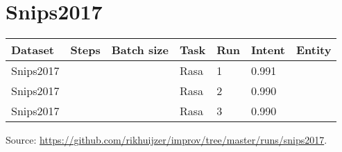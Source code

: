 \section{Snips2017}
\label{sec:runs_snips}
\begin{center}
    \begin{tabular}{l l l l l l l}
        \textbf{Dataset} & \textbf{Steps} & \textbf{Batch size} & \textbf{Task} & \textbf{Run} & \textbf{Intent} & \textbf{Entity} \\
        \hline
        Snips2017 & & & Rasa & 1 & 0.991 \\
        Snips2017 & & & Rasa & 2 & 0.990 \\
        Snips2017 & & & Rasa & 3 & 0.990 \\
    \end{tabular}
\end{center}

\noindent Source: \url{https://github.com/rikhuijzer/improv/tree/master/runs/snips2017}.
